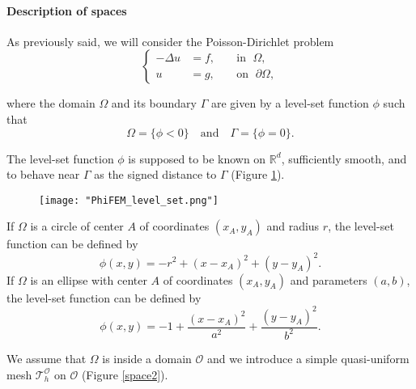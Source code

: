 \paragraph{Description of spaces} 


As previously said, we will consider the Poisson-Dirichlet problem
\begin{equation}
	\left\{
	\begin{aligned}
		-\Delta u &= f, \; &&\text{in } \; \Omega, \\
		u&=g, \; &&\text{on } \; \partial\Omega,
	\end{aligned}
	\right.
	\label{eq.Poisson}
\end{equation}

where the domain $\Omega$ and its boundary $\Gamma$ are given by a level-set function $\phi$ such that
\begin{equation*}
	\Omega=\{\phi < 0\} \quad \text{and} \quad \Gamma=\{\phi = 0\}.
\end{equation*}

The level-set function $\phi$ is supposed to be known on $\mathbb{R}^d$, sufficiently smooth, and to behave near $\Gamma$ as the signed distance to $\Gamma$ (Figure \ref{space1}). 

\begin{figure}[H]
	\centering
	\texttt{[image: "PhiFEM\_level\_set.png"]}
	\label{space1}
\end{figure}

\begin{Example}
	If $\Omega$ is a circle of center $A$ of coordinates $(x_A,y_A)$ and radius $r$, the level-set function can be defined by
	\begin{equation*}
		\phi(x,y)=-r^2+(x-x_A)^2+(y-y_A)^2.
	\end{equation*}
	If $\Omega$ is an ellipse with center $A$ of coordinates $(x_A,y_A)$ and parameters $(a,b)$, the level-set function can be defined by
	\begin{equation*}
		\phi(x,y)=-1+\frac{(x-x_A)^2}{a^2}+\frac{(y-y_A)^2}{b^2}.
	\end{equation*}
\end{Example}

We assume that $\Omega$ is inside a domain $\mathcal{O}$ and we introduce a simple quasi-uniform mesh $\mathcal{T}_h^\mathcal{O}$ on $\mathcal{O}$ (Figure \ref{space2}).
 

